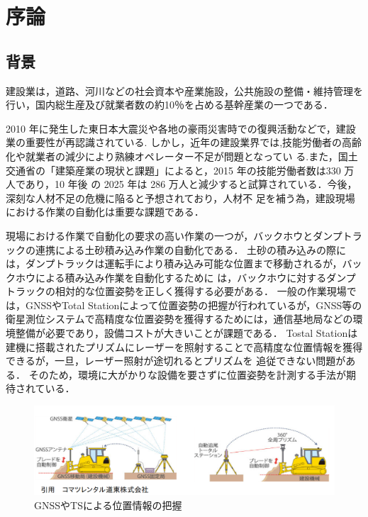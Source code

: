 \chapter{序論}
\thispagestyle{empty}
\label{Chap1}
\minitoc

\newpage

\section{背景}
\label{Background}
建設業は，道路、河川などの社会資本や産業施設，公共施設の整備・維持管理を行い，国内総生産及び就業者数の約10％を占める基幹産業の一つである．\cite{日本建設組合連合2016}
\par 2010 年に発生した東日本大震災や各地の豪雨災害時での復興活動などで，建設業の重要性が再認識されている.
しかし，近年の建設業界では,技能労働者の高齢化や就業者の減少により熟練オペレーター不足が問題となってい
る.また，国土交通省の「建築産業の現状と課題」\cite{建設経済研究所2017}によると，2015 年の技能労働者数は330 万人であり，10 年後
の 2025 年は 286 万人と減少すると試算されている．今後，深刻な人材不足の危機に陥ると予想されており，人材不
足を補う為，建設現場における作業の自動化は重要な課題である．
\par
現場における作業で自動化の要求の高い作業の一つが，バックホウとダンプトラックの連携による土砂積み込み作業の自動化である．
土砂の積み込みの際には，ダンプトラックは運転手により積み込み可能な位置まで移動されるが，バックホウによる積み込み作業を自動化するために
は，バックホウに対するダンプトラックの相対的な位置姿勢を正しく獲得する必要がある．
一般の作業現場では，GNSSやTotal Stationによって位置姿勢の把握\cite{土井下2010}が行われているが，GNSS等の衛星測位システムで高精度な位置姿勢を獲得するためには，通信基地局などの環境整備が必要であり，設備コストが大きいことが課題である．
Tostal Stationは建機に搭載されたプリズムにレーザーを照射することで高精度な位置情報を獲得できるが，一旦，レーザー照射が途切れるとプリズムを
追従できない問題がある．
そのため，環境に大がかりな設備を要さずに位置姿勢を計測する手法が期待されている．
\begin{figure}[b]
 \begin{center}
 \includegraphics[width=1.0\columnwidth]{./chap1/fig/GNSS.png}
 \caption{GNSSやTSによる位置情報の把握}
 \label{fig:GNSS}
 \end{center}
\end{figure}

